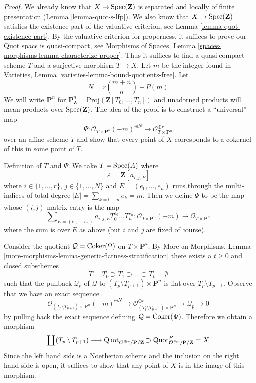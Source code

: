 \begin{proof}
We already know that $X \to \mathop{\mathrm{Spec}}(\mathbf{Z})$ is separated and
locally of finite presentation (Lemma \ref{lemma-quot-s-lfp}).
We also know that $X \to \mathop{\mathrm{Spec}}(\mathbf{Z})$ satisfies the
existence part of the valuative criterion, see
Lemma \ref{lemma-quot-existence-part}.
By the valuative criterion for properness, it suffices to
prove our Quot space is quasi-compact, see
Morphisms of Spaces,
Lemma \ref{spaces-morphisms-lemma-characterize-proper}.
Thus it suffices to find a quasi-compact scheme $T$ and a surjective
morphism $T \to X$. Let $m$ be the integer found in
Varieties, Lemma \ref{varieties-lemma-bound-quotients-free}.
Let
$$
N = r{m + n \choose n} - P(m)
$$
We will write $\mathbf{P}^n$ for
$\mathbf{P}^n_\mathbf{Z} = \text{Proj}(\mathbf{Z}[T_0, \ldots, T_n])$
and unadorned products will mean products over $\mathop{\mathrm{Spec}}(\mathbf{Z})$.
The idea of the proof is to construct a ``universal'' map
$$
\Psi :
\mathcal{O}_{T \times \mathbf{P}^n}(-m)^{\oplus N}
\longrightarrow
\mathcal{O}_{T \times \mathbf{P}^n}^{\oplus r}
$$
over an affine scheme $T$ and show that every point of $X$
corresponds to a cokernel of this in some point of $T$.

\medskip\noindent
Definition of $T$ and $\Psi$. We take $T = \mathop{\mathrm{Spec}}(A)$ where
$$
A = \mathbf{Z}[a_{i, j, E}]
$$
where $i \in \{1, \ldots, r\}$, $j \in \{1, \ldots, N\}$
and $E = (e_0, \ldots, e_n)$ runs through the multi-indices
of total degree $|E| = \sum_{k = 0, \ldots n} e_k = m$.
Then we define $\Psi$ to be the map whose $(i, j)$ matrix
entry is the map
$$
\sum\nolimits_{E = (e_0, \ldots, e_n)}
a_{i, j, E} T_0^{e_0} \ldots T_n^{e_n} :
\mathcal{O}_{T \times \mathbf{P}^n}(-m)
\longrightarrow
\mathcal{O}_{T \times \mathbf{P}^n}
$$
where the sum is over $E$ as above (but $i$ and $j$ are fixed of course).

\medskip\noindent
Consider the quotient $\mathcal{Q} = \mathop{\mathrm{Coker}}(\Psi)$ on $T \times \mathbf{P}^n$.
By More on Morphisms, Lemma
\ref{more-morphisms-lemma-generic-flatness-stratification}
there exists a $t \geq 0$ and closed subschemes
$$
T = T_0 \supset T_1 \supset \ldots \supset T_t = \emptyset
$$
such that the pullback $\mathcal{Q}_p$ of $\mathcal{Q}$ to
$(T_p \setminus T_{p + 1}) \times \mathbf{P}^n$ is flat over
$T_p \setminus T_{p + 1}$. Observe that we
have an exact sequence
$$
\mathcal{O}_{(T_p \setminus T_{p + 1}) \times \mathbf{P}^n}(-m)^{\oplus N}
\to
\mathcal{O}_{(T_p \setminus T_{p + 1}) \times \mathbf{P}^n}^{\oplus r}
\to
\mathcal{Q}_p
\to
0
$$
by pulling back the exact sequence defining $\mathcal{Q} = \mathop{\mathrm{Coker}}(\Psi)$.
Therefore we obtain a morphism
$$
\coprod (T_p \setminus T_{p + 1})
\longrightarrow
\mathrm{Quot}_{\mathcal{O}^{\oplus r}/\mathbf{P}/\mathbf{Z}}
\supset
\mathrm{Quot}^P_{\mathcal{O}^{\oplus r}/\mathbf{P}/\mathbf{Z}} = X
$$
Since the left hand side is a Noetherian scheme and the inclusion
on the right hand side is open, it
suffices to show that any point of $X$ is in the image of this morphism.


\end{proof}
